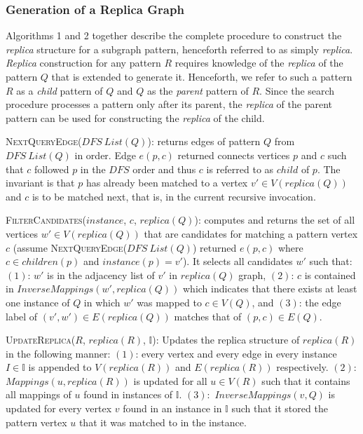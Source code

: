\subsubsection{Generation of a Replica Graph}
\label{subsubsec:replica-gen}
Algorithms 1 and 2 together describe the complete procedure to construct the
\emph{replica} structure for a subgraph pattern, henceforth referred to as
simply \emph{replica}. \emph{Replica} construction for any pattern $R$ requires
knowledge of the \emph{replica} of the pattern $Q$ that is extended to generate
it. Henceforth, we refer to such a pattern $R$ as a \textit{child} pattern of
$Q$ and $Q$ as the \textit{parent} pattern of $R$. Since the search procedure
processes a pattern only after its parent, the \emph{replica} of the
parent pattern can be used for constructing the \emph{replica} of the
child.

\textsc{NextQueryEdge($DFS\ List(Q)$)}: returns edges of pattern $Q$ from $DFS\
List(Q)$ in order. Edge $e(p,c)$ returned connects vertices $p$ and $c$ such
that $c$ followed $p$ in the $DFS$ order and thus $c$ is referred to as $child$
of $p$. The invariant is that $p$ has already been matched to a vertex $v'\in
V(replica(Q))$ and $c$ is to be matched next, that is, in the current recursive
invocation. 

\textsc{FilterCandidates($instance$, $c$, $replica(Q)$)}: computes and returns
the set of all vertices $w'\in V(replica(Q))$ that are candidates for matching a
pattern vertex $c$ (assume \textsc{NextQueryEdge($DFS\ List(Q)$)} returned
$e(p,c)$ where $c\in children(p)$ and $instance(p)=v'$). It selects all candidates $w'$ such that:
$(1)$:  $w'$ is in the adjacency list of $v'$ in $replica(Q)$ graph, $(2)$: $c$
is contained in $InverseMappings(w', replica(Q))$ which indicates that there
exists at least one instance of $Q$ in which $w'$ was mapped to $c \in V(Q)$,
and $(3)$: the edge label of $(v',w')\in E(replica(Q))$ matches that of $(p,c)
\in E(Q)$.

\textsc{UpdateReplica($R$, $replica(R)$, $\mathbb{I}$)}: Updates the replica
structure of $replica(R)$ in the following manner: $(1)$: every vertex and every
edge in every instance $I\in
\mathbb{I}$ is appended to $V(replica(R))$ and $E(replica(R))$ respectively.
$(2)$: $Mappings(u, replica(R))$ is updated for all $u \in V(R)$ such that it
contains all mappings of $u$ found in instances of $\mathbb{I}$. $(3):$
$InverseMappings(v,Q)$ is updated for every vertex $v$ found in an instance in
$\mathbb{I}$ such that it stored the pattern vertex $u$ that it was matched to
in the instance.


